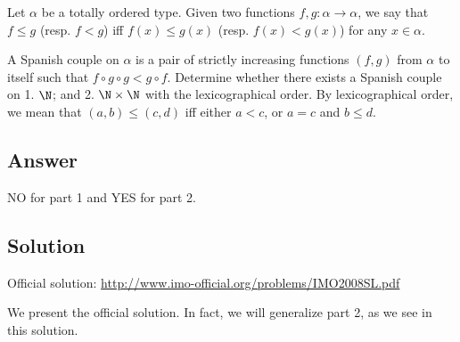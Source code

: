 Let $\alpha$ be a totally ordered type.
Given two functions $f, g : \alpha \to \alpha$, we say that $f \leq g$ (resp. $f < g$) iff $f(x) \leq g(x)$ (resp. $f(x) < g(x)$) for any $x \in \alpha$.

A Spanish couple on $\alpha$ is a pair of strictly increasing functions $(f, g)$ from $\alpha$ to itself such that $f \circ g \circ g < g \circ f$.
Determine whether there exists a Spanish couple on 1. $\N$; and 2. $\N \times \N$ with the lexicographical order.
By lexicographical order, we mean that $(a, b) \leq (c, d)$ iff either $a < c$, or $a = c$ and $b \leq d$.



\subsection*{Answer}

NO for part 1 and YES for part 2.



\subsection*{Solution}

Official solution: \url{http://www.imo-official.org/problems/IMO2008SL.pdf}

We present the official solution.
In fact, we will generalize part 2, as we see in this solution.

